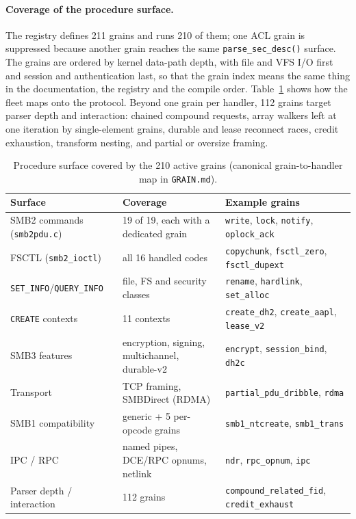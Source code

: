 \documentclass{article}
\begin{document}
\paragraph{Coverage of the procedure surface.} The registry defines 211
grains and runs 210 of them; one ACL grain is suppressed because another
grain reaches the same \texttt{parse\_sec\_desc()} surface. The grains are
ordered by kernel data-path depth, with file and VFS I/O first and session
and authentication last, so that the grain index means the same thing in the
documentation, the registry and the compile order. Table~\ref{tab:surface}
shows how the fleet maps onto the protocol. Beyond one grain per handler,
112 grains target parser depth and interaction: chained compound requests,
array walkers left at one iteration by single-element grains, durable and
lease reconnect races, credit exhaustion, transform nesting, and partial or
oversize framing.

\begin{table}[t]
\centering
\caption{Procedure surface covered by the 210 active grains (canonical
grain-to-handler map in \texttt{GRAIN.md}).}\label{tab:surface}
\small
\begin{tabular}{@{}lll@{}}
\toprule
\textbf{Surface} & \textbf{Coverage} & \textbf{Example grains} \\
\midrule
SMB2 commands (\texttt{smb2pdu.c})     & 19 of 19, each with a dedicated grain & \texttt{write}, \texttt{lock}, \texttt{notify}, \texttt{oplock\_ack} \\
FSCTL (\texttt{smb2\_ioctl})           & all 16 handled codes                 & \texttt{copychunk}, \texttt{fsctl\_zero}, \texttt{fsctl\_dupext} \\
\texttt{SET\_INFO}/\texttt{QUERY\_INFO} & file, FS and security classes       & \texttt{rename}, \texttt{hardlink}, \texttt{set\_alloc} \\
\texttt{CREATE} contexts               & 11 contexts                          & \texttt{create\_dh2}, \texttt{create\_aapl}, \texttt{lease\_v2} \\
SMB3 features                          & encryption, signing, multichannel, durable-v2 & \texttt{encrypt}, \texttt{session\_bind}, \texttt{dh2c} \\
Transport                              & TCP framing, SMBDirect (RDMA)        & \texttt{partial\_pdu\_dribble}, \texttt{rdma} \\
SMB1 compatibility                     & generic + 5 per-opcode grains        & \texttt{smb1\_ntcreate}, \texttt{smb1\_trans} \\
IPC / RPC                              & named pipes, DCE/RPC opnums, netlink & \texttt{ndr}, \texttt{rpc\_opnum}, \texttt{ipc} \\
Parser depth / interaction             & 112 grains                           & \texttt{compound\_related\_fid}, \texttt{credit\_exhaust} \\
\bottomrule
\end{tabular}
\end{table}
\end{document}
